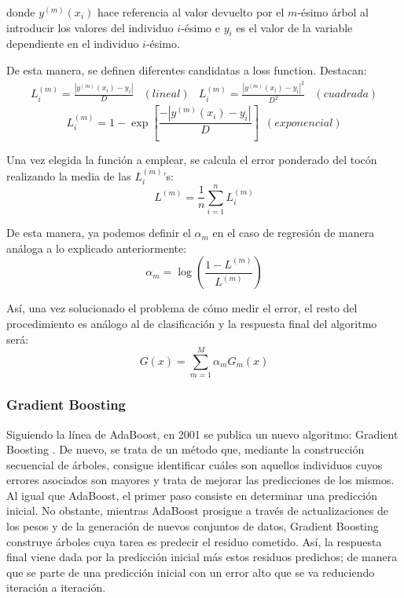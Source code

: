 \documentclass[12pt,twoside]{article}
\begin{document}
\noindent
donde $y^{(m)}(x_i)$ hace referencia al valor devuelto por el $m$-ésimo árbol al introducir los valores del individuo $i$-ésimo e $y_i$ es el valor de la variable dependiente en el individuo $i$-ésimo.

De esta manera, se definen diferentes candidatas a loss function. Destacan:
\begin{equation*}
\begin{array}{cr|cr}
L_i^{(m)} = \frac{|y^{(m)}(x_i) - y_i|}{D} & (lineal) & L_i^{(m)} = \frac{|y^{(m)}(x_i) - y_i|^2}{D^2} & (cuadrada) 
\end{array}
\end{equation*}
\begin{equation*}
L_i^{(m)} = 1 - \exp \left[ \frac{-|y^{(m)}(x_i) - y_i|}{D} \right] \, \, \, (exponencial)
\end{equation*}

Una vez elegida la función a emplear, se calcula el error ponderado del tocón realizando la media de las $L_i^{(m)}$'s:
\begin{equation*}
L^{(m)} = \frac{1}{n}\sum_{i=1}^n L_i^{(m)}
\end{equation*}

De esta manera, ya podemos definir el $\alpha_m$ en el caso de regresión de manera análoga a lo explicado anteriormente:
\begin{equation*}
\alpha_m = \log \left( \frac{1 - L^{(m)}}{L^{(m)}} \right)
\end{equation*}

Así, una vez solucionado el problema de cómo medir el error, el resto del procedimiento es análogo al de clasificación y la respuesta final del algoritmo será:
\begin{equation*}
G(x) = \sum_{m=1}^M \alpha_m G_m(x)
\end{equation*}





\subsubsection{Gradient Boosting} \label{sec:GB}

Siguiendo la línea de AdaBoost, en 2001 se publica un nuevo algoritmo: Gradient Boosting \cite{FR03}. De nuevo, se trata de un método que, mediante la construcción secuencial de árboles, consigue identificar cuáles son aquellos individuos cuyos errores asociados son mayores y trata de mejorar las predicciones de los mismos. Al igual que AdaBoost, el primer paso consiste en determinar una predicción inicial. No obstante, mientras AdaBoost prosigue a través de actualizaciones de los pesos y de la generación de nuevos conjuntos de datos, Gradient Boosting construye árboles cuya tarea es predecir el residuo cometido. Así, la respuesta final viene dada por la predicción inicial más estos residuos predichos; de manera que se parte de una predicción inicial con un error alto que se va reduciendo iteración a iteración.
\end{document}
